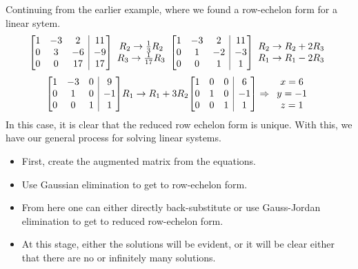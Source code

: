 \documentclass[12pt]{report}
\makeatletter
\newenvironment{amatrix}[1]{
    \left[\begin{array}{@{}*{#1}{c}|c@{}}
}{
    \end{array}\right]
}
\makeatother
\begin{document}
\begin{flushleft}
Continuing from the earlier example, where we found a row-echelon form for a
linear sytem.
\[
    \begin{amatrix}{3}
        1 & -3 & 2 & 11 \\
        0 & 3 & -6 & -9 \\
        0 & 0 & 17 & 17 \\
    \end{amatrix}
    \begin{array}{c}
        R_2 \rightarrow \frac{1}{3} R_2 \\
        R_3 \rightarrow \frac{1}{17} R_3
    \end{array}
    \begin{amatrix}{3}
        1 & -3 & 2 & 11 \\
        0 & 1 & -2 & -3 \\
        0 & 0 & 1 & 1 \\
    \end{amatrix}
    \begin{array}{c}
        R_2 \rightarrow R_2 + 2R_3 \\
        R_1 \rightarrow R_1 - 2R_3
    \end{array}
\]
\[
    \begin{amatrix}{3}
        1 & -3 & 0 & 9 \\
        0 & 1 & 0 & -1 \\
        0 & 0 & 1 & 1 \\
    \end{amatrix}
    R_1 \rightarrow R_1 + 3R_2
    \begin{amatrix}{3}
        1 & 0 & 0 & 6 \\
        0 & 1 & 0 & -1 \\
        0 & 0 & 1 & 1 \\
    \end{amatrix}
    \Rightarrow
    \begin{array}{c}
        x = 6 \\
        y = -1 \\
        z = 1 \\
    \end{array}
\]
In this case, it is clear that the reduced row echelon form is unique.
With this, we have our general process for solving linear systems.

\begin{itemize}
    \item First, create the augmented matrix from the equations.
    \item Use Gaussian elimination to get to row-echelon form.
    \item From here one can either directly back-substitute or use Gauss-Jordan
        elimination to get to reduced row-echelon form.
    \item At this stage, either the solutions will be evident, or it will be
        clear either that there are no or infinitely many solutions.
\end{itemize}


\end{flushleft}
\end{document}
